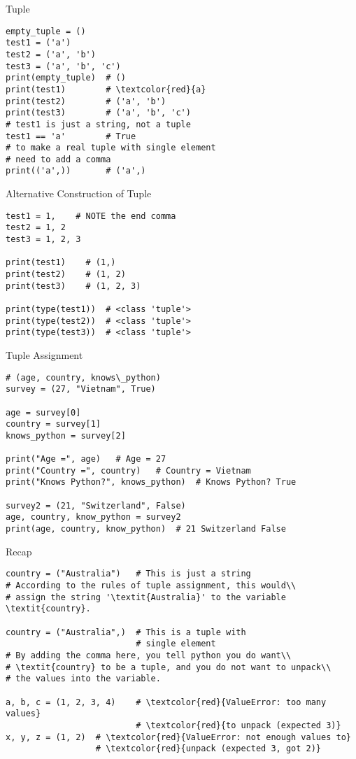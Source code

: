 \documentclass{beamer}
\begin{document}
\begin{frame}[fragile]{Tuple}
\begin{verbatim}
empty_tuple = ()
test1 = ('a')
test2 = ('a', 'b')
test3 = ('a', 'b', 'c')
print(empty_tuple)  # ()
print(test1)        # \textcolor{red}{a}
print(test2)        # ('a', 'b')
print(test3)        # ('a', 'b', 'c')
# test1 is just a string, not a tuple
test1 == 'a'        # True
# to make a real tuple with single element
# need to add a comma
print(('a',))       # ('a',)
\end{verbatim}
\end{frame}

\begin{frame}[fragile]{Alternative Construction of Tuple}
\begin{verbatim}
test1 = 1,    # NOTE the end comma
test2 = 1, 2
test3 = 1, 2, 3

print(test1)    # (1,)
print(test2)    # (1, 2)
print(test3)    # (1, 2, 3)

print(type(test1))  # <class 'tuple'> 
print(type(test2))  # <class 'tuple'>
print(type(test3))  # <class 'tuple'>
\end{verbatim}
\end{frame}

\begin{frame}[fragile]{Tuple Assignment}
\begin{verbatim}
# (age, country, knows\_python)
survey = (27, "Vietnam", True)

age = survey[0]
country = survey[1]
knows_python = survey[2]

print("Age =", age)   # Age = 27
print("Country =", country)   # Country = Vietnam
print("Knows Python?", knows_python)  # Knows Python? True

survey2 = (21, "Switzerland", False)
age, country, know_python = survey2
print(age, country, know_python)  # 21 Switzerland False
\end{verbatim}
\end{frame}

\begin{frame}[fragile]{Recap}
\begin{verbatim}
country = ("Australia")   # This is just a string
# According to the rules of tuple assignment, this would\\
# assign the string '\textit{Australia}' to the variable \textit{country}.

country = ("Australia",)  # This is a tuple with 
                          # single element
# By adding the comma here, you tell python you do want\\
# \textit{country} to be a tuple, and you do not want to unpack\\
# the values into the variable.

a, b, c = (1, 2, 3, 4)    # \textcolor{red}{ValueError: too many values}
                          # \textcolor{red}{to unpack (expected 3)}
x, y, z = (1, 2)  # \textcolor{red}{ValueError: not enough values to}
                  # \textcolor{red}{unpack (expected 3, got 2)}
\end{verbatim}
\end{frame}
\end{document}
